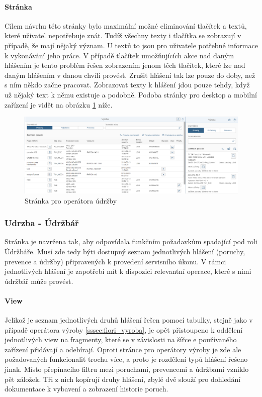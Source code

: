 \documentclass[thesis=M,czech]{FITthesis}[2012/06/26]
\begin{document}
\paragraph{Stránka}
Cílem návrhu této stránky bylo maximální možné eliminování tlačítek a textů, které uživatel nepotřebuje znát. Tudíž všechny texty i tlačítka se zobrazují v případě, že mají nějaký význam. U textů to jsou pro uživatele potřebné informace k vykonávání jeho práce. V případě tlačítek umožňujících akce nad daným hlášením je tento problém řešen zobrazením jenom těch tlačítek, které lze nad daným hlášením v danou chvíli provést. Zrušit hlášení tak lze pouze do doby, než s ním někdo začne pracovat. Zobrazovat texty k hlášení jdou pouze tehdy, když už nějaký text k němu existuje a podobně. Podoba stránky pro desktop a mobilní zařízení je vidět na obrázku \ref{img:view_vyroba} níže.
\begin{figure}[H]
	\centering
	\includegraphics[width=1\textwidth]{images/view_vyroba}
	\caption{Stránka pro operátora údržby}
	\label{img:view_vyroba}
\end{figure}

\subsubsection{Udrzba - Údržbář}
\label{sssec:fiori_udrzba}
Stránka je navržena tak, aby odpovídala funkčním požadavkům spadající pod roli Údržbáře. Musí zde tedy býti dostupný seznam jednotlivých hlášení (poruchy, prevence a údržby) připravených k provedení servisního úkonu. V rámci jednotlivých hlášení je zapotřebí mít k dispozici relevantní operace, které s nimi údržbář může provést.
\paragraph{View}
Jelikož je seznam jednotlivých druhů hlášení řešen pomocí tabulky, stejně jako v případě operátora výroby \ref{sssec:fiori_vyroba}, je opět přistoupeno k oddělení jednotlivých view na fragmenty, které se v závislosti na šířce e používaného zařízení přidávají a odebírají. Oproti stránce pro operátory výroby je zde ale požadovaných funkcionalit trochu více, a proto je rozdělení typů hlášení řešeno jinak. Místo přepínacího filtru mezi poruchami, prevencemi a údržbami vzniklo pět záložek. Tři z nich kopírují druhy hlášení, zbylé dvě slouží pro dohledání dokumentace k vybavení a zobrazení historie poruch.
\end{document}
